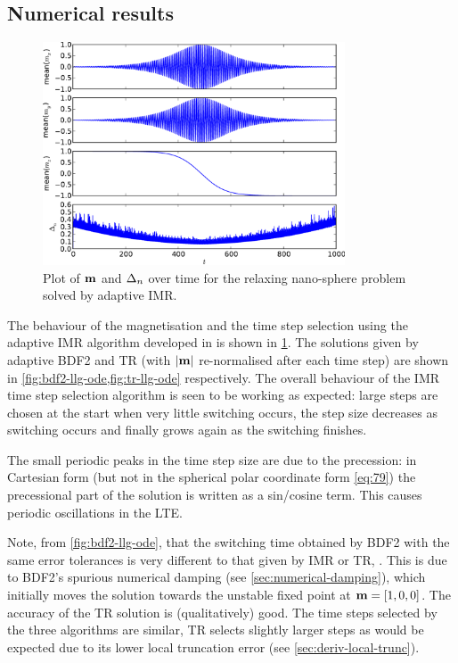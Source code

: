 \subsection{Numerical results}
\label{sec:aimr-llgode-numerical-results}

\begin{figure}
  \centering
  \includegraphics[width=0.8\textwidth]{plots/aimr-sphere-relax/imr0-meanmxsvs-meanmysvs-meanmzsvs-dtsvstimes.pdf}
  \caption{Plot of $\boldsymbol{\mathrm{m}}$ and $\Delta_{n}$ over time for the relaxing nano-sphere problem solved by adaptive IMR.}
  \label{fig:imr-llg-ode}
\end{figure}

The behaviour of the magnetisation and the time step selection using the adaptive IMR algorithm developed in  is shown in \cref{fig:imr-llg-ode}.
The solutions given by adaptive BDF2 and TR (with $\left|{\boldsymbol{\mathrm{m}}} \right|$ re-normalised after each time step)  are shown in \cref{fig:bdf2-llg-ode,fig:tr-llg-ode} respectively.
The overall behaviour of the IMR time step selection algorithm is seen to be working as expected: large steps are chosen at the start when very little switching occurs, the step size decreases as switching occurs and finally grows again as the switching finishes.

The small periodic peaks in the time step size are due to the precession: in Cartesian form (but not in the spherical polar coordinate form \cref{eq:79}) the precessional part of the solution is written as a sin/cosine term.
This causes periodic oscillations in the LTE.

Note, from \cref{fig:bdf2-llg-ode}, that the switching time obtained by BDF2 with the same error tolerances is very different to that given by IMR or TR, .
This is due to BDF2's spurious numerical damping (see \cref{sec:numerical-damping}), which initially moves the solution towards the unstable fixed point at $\boldsymbol{\mathrm{m}}=[1, 0, 0]$.
The accuracy of the TR solution is (qualitatively) good.
The time steps selected by the three algorithms are similar, TR selects slightly larger steps as would be expected due to its lower local truncation error (see \cref{sec:deriv-local-trunc}).


